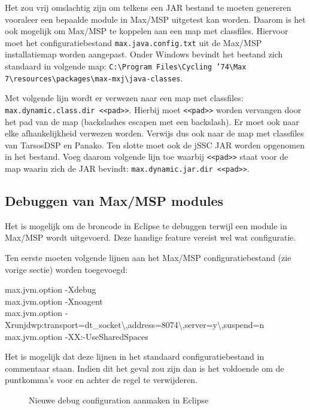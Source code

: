 Het zou vrij omslachtig zijn om telkens een JAR bestand te moeten genereren vooraleer een bepaalde module in Max/MSP uitgetest kan worden. Daarom is het ook mogelijk om Max/MSP te koppelen aan een map met classfiles. Hiervoor moet het configuratiebestand \texttt{max.java.config.txt} uit de Max/MSP installatiemap worden aangepast. Onder Windows bevindt het bestand zich standaard in volgende map: \texttt{C:\textbackslash Program Files\textbackslash Cycling '74\textbackslash Max 7\textbackslash resources\textbackslash packages\textbackslash max-mxj\textbackslash java-classes}.

Met volgende lijn wordt er verwezen naar een map met classfiles: \texttt{max.dynamic.class.dir <<pad>>}. Hierbij moet \texttt{<<pad>>} worden vervangen door het pad van de map (backslashes escapen met een backslash). Er moet ook naar elke afhankelijkheid verwezen worden. Verwijs dus ook naar de map met classfiles van TarsosDSP en Panako. Ten slotte moet ook de jSSC JAR worden opgenomen in het bestand. Voeg daarom volgende lijn toe waarbij \texttt{<<pad>>} staat voor de map waarin zich de JAR bevindt: \texttt{max.dynamic.jar.dir <<pad>>}.

\subsection*{Debuggen van Max/MSP modules}

Het is mogelijk om de broncode in Eclipse te debuggen terwijl een module in Max/MSP wordt uitgevoerd. Deze handige feature vereist wel wat configuratie.

Ten eerste moeten volgende lijnen aan het Max/MSP configuratiebestand (zie vorige sectie) worden toegevoegd:

\begin{allintypewriter}
max.jvm.option -Xdebug \\
max.jvm.option -Xnoagent \\
max.jvm.option -Xrunjdwp:transport=dt\_socket\textbackslash ,address=8074\textbackslash,server=y\textbackslash,suspend=n \\
max.jvm.option -XX:-UseSharedSpaces
\end{allintypewriter}
Het is mogelijk dat deze lijnen in het standaard configuratiebestand in commentaar staan. Indien dit het geval zou zijn dan is het voldoende om de puntkomma's voor en achter de regel te verwijderen.

\begin{figure}[!tbph]
	\centering
	\hfill
	\hfill
	\captionsetup{width=0.7\textwidth}
	\caption{Nieuwe debug configuration aanmaken in Eclipse}
	\label{debugconf}
\end{figure}

